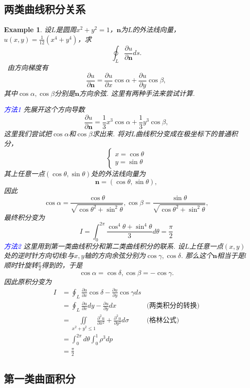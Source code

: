\documentclass{article}
\newtheorem{example}[theorem]{Example}
\newcommand{\hints}{{\color{blue} \text{hints}}}
\newcommand{\bluet}[1]{\textcolor{blue}{#1}}
\begin{document}
\subsection{两类曲线积分关系}

\begin{example}
\rm 设$L$是圆周$x^2 + y^2 = 1$，$\bm{n}$为$L$的外法线向量，$u(x,y) = \frac{1}{12}(x^4 + y^4)$，求
$$
\oint_L \frac{\partial u}{\partial \bm{n}}ds.
$$
\hints\ 由方向梯度有
$$
\frac{\partial u}{\partial \bm{n}} = \frac{\partial u}{\partial x}\cos\alpha + \frac{\partial u}{\partial y}\cos \beta,
$$
其中$\cos\alpha,\cos\beta$分别是$\bm{n}$方向余弦. 这里有两种手法来尝试计算.  

\bluet{方法1} 先展开这个方向导数
$$
\frac{\partial u}{\partial \bm{n}} = \frac{1}{3}x^3\cos\alpha + \frac{1}{3}y^3\cos\beta,
$$
这里我们尝试把$\cos\alpha$和$\cos\beta$求出来. 将对$L$曲线积分变成在极坐标下的普通积分，
$$
\left\{
\begin{array}{ll}
x = \cos\theta \\
y = \sin\theta
\end{array}\right.
$$
其上任意一点$(\cos \theta,\sin\theta)$处的外法线向量为
$$
\bm{n} = (\cos\theta, \sin\theta),
$$
因此
$$
\cos\alpha = \frac{\cos\theta}{\sqrt{{\cos\theta^2 + \sin^2\theta}}}, \cos\beta =\frac{\sin\theta}{\sqrt{{\cos\theta^2 + \sin^2\theta}}},
$$
最终积分变为
$$
I = \int_{0}^{2\pi} \frac{\cos^4\theta + \sin^4\theta}{3}d\theta = \frac{\pi}{2}
$$
\bluet{方法2} 这里用到第一类曲线积分和第二类曲线积分的联系. 设$L$上任意一点$(x,y)$处的逆时针方向切线$l$与$x,y$轴的方向余弦分别为$\cos\gamma,\cos\delta$. 那么这个$\bm{n}$相当于是$l$顺时针旋转$\frac{\pi}{2}$得到的，于是
$$
\cos\alpha = \cos\delta, \cos\beta = -\cos\gamma.
$$
因此原积分变为
$$
\begin{aligned}
I  &= \oint_L \frac{\partial u}{\partial x}\cos\delta -\frac{\partial u}{\partial y}\cos\gamma ds \\
&= \oint_L\frac{\partial u}{\partial x}dy -\frac{\partial u}{\partial y}dx & \text{(两类积分的转换)} \\
&= \iint\limits_{x^2 + y^2 \leq 1} \frac{\partial^2 u}{\partial x^2} + \frac{\partial^2 u}{\partial y^2}d\sigma & \text{(格林公式)} \\
&= \int_{0}^{2\pi}d\theta \int_0^1 \rho^3dp \\
&= \frac{\pi}{2}
\end{aligned}
$$
\end{example}

\subsection{第一类曲面积分}
\end{document}
